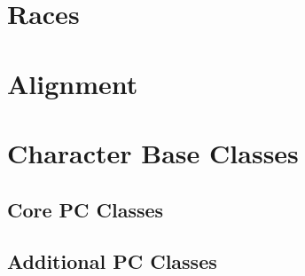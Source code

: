 \documentclass[10pt]{report}
\newcommand{\normalsections}{
\sectionfont{\noindent\rule{\textwidth}{0.015in}\\\nohang}
\subsectionfont{\noindent\rule{\textwidth}{0.005in}\\\nohang}
}
\newcommand{\itemspace}{\setlength{\itemsep}{-1mm}\setlength{\topsep}{-1mm} }
\begin{document}





\pagestyle{fancy}
\linespread{.9}  \small  \normalsize \itemspace \normalsections

\tableofcontents

\chapter{Races}


\chapter{Alignment}




\chapter{Character Base Classes}

\section{Core PC Classes}


%




%




\section{Additional PC Classes}









%







%
\end{document}
